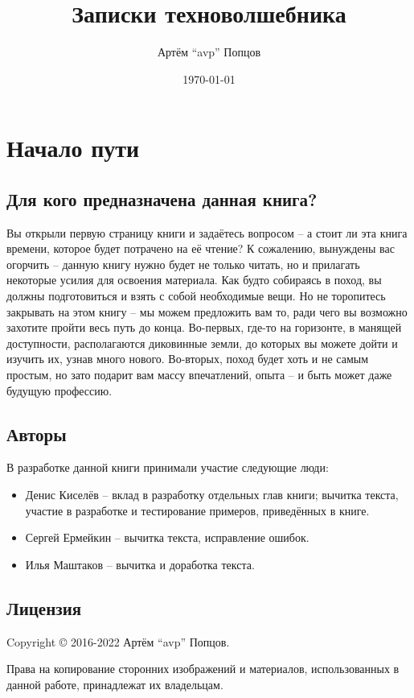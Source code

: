 \documentclass[a4paper,twoside]{book}
\title{Записки техноволшебника}
\author{Артём ``avp'' Попцов}
\date{\today}
\begin{document}
\maketitle

\tableofcontents

\chapter{Начало пути}

\section{Для кого предназначена данная книга?}
Вы открыли первую страницу книги и задаётесь вопросом -- а стоит ли эта книга
времени, которое будет потрачено на её чтение? К сожалению, вынуждены вас
огорчить -- данную книгу нужно будет не только читать, но и прилагать некоторые
усилия для освоения материала. Как будто собираясь в поход, вы должны
подготовиться и взять с собой необходимые вещи. Но не торопитесь закрывать на
этом книгу -- мы можем предложить вам то, ради чего вы возможно захотите пройти
весь путь до конца. Во-первых, где-то на горизонте, в манящей доступности,
располагаются диковинные земли, до которых вы можете дойти и изучить их, узнав
много нового. Во-вторых, поход будет хоть и не самым простым, но зато подарит
вам массу впечатлений, опыта -- и быть может даже будущую профессию.

\section{Авторы}
В разработке данной книги принимали участие следующие люди:
\begin{itemize}
\item Денис Киселёв -- вклад в разработку отдельных глав книги; вычитка текста,
  участие в разработке и тестирование примеров, приведённых в книге.
\item Сергей Ермейкин -- вычитка текста, исправление ошибок.
\item Илья Маштаков – вычитка и доработка текста.
\end{itemize}

\section{Лицензия}
Copyright © 2016-2022 Артём ``avp'' Попцов.

Права на копирование сторонних изображений и материалов, использованных в данной
работе, принадлежат их владельцам.
\end{document}
